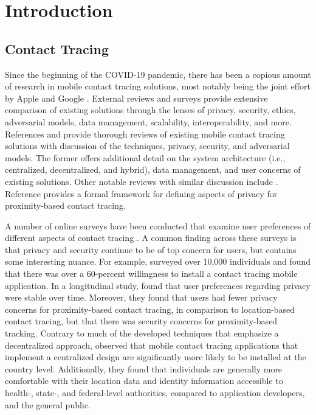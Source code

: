 \chapter{Introduction}

\section{Contact Tracing}

Since the beginning of the COVID-19 pandemic, there has been a copious amount of research in mobile contact tracing solutions, most notably being the joint effort by Apple and Google \cite{AppleGoogle}. External reviews and surveys provide extensive comparison of existing solutions through the lenses of privacy, security, ethics, adversarial models, data management, scalability, interoperability, and more. References \cite{Ahmed2020} and \cite{Martin2020} provide thorough reviews of existing mobile contact tracing solutions with discussion of the techniques, privacy, security, and adversarial models. The former offers additional detail on the system architecture (i.e., centralized, decentralized, and hybrid), data management, and user concerns of existing solutions. Other notable reviews with similar discussion include \cite{Wen2020, Raskar2020, Cho2020, Dar2020, Lucivero2020}. Reference \cite{Kuhn2021} provides a formal framework for defining aspects of privacy for proximity-based contact tracing.

A number of online surveys have been conducted that examine user preferences of different aspects of contact tracing \cite{Simko2020, Altmann2020, Li2020}. A common finding across these surveys is that privacy and security continue to be of top concern for users, but contains some interesting nuance. For example, \cite{Altmann2020} surveyed over 10,000 individuals and found that there was over a 60-percent willingness to install a contact tracing mobile application. In a longitudinal study, \cite{Simko2020} found that user preferences regarding privacy were stable over time. Moreover, they found that users had fewer privacy concerns for proximity-based contact tracing, in comparison to location-based contact tracing, but that there was security concerns for proximity-based tracking. Contrary to much of the developed techniques that emphasize a decentralized approach, \cite{Li2020} observed that mobile contact tracing applications that implement a centralized design are significantly more likely to be installed at the country level. Additionally, they found that individuals are generally more comfortable with their location data and identity information accessible to health-, state-, and federal-level authorities, compared to application developers, and the general public.

